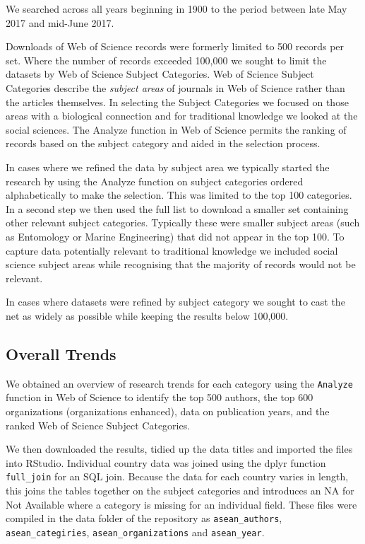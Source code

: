 \documentclass[]{book}
\theoremstyle{definition}
\theoremstyle{definition}
\theoremstyle{definition}
\theoremstyle{remark}
\begin{document}
We searched across all years beginning in 1900 to the period between
late May 2017 and mid-June 2017.

Downloads of Web of Science records were formerly limited to 500 records
per set. Where the number of records exceeded 100,000 we sought to limit
the datasets by Web of Science Subject Categories. Web of Science
Subject Categories describe the \emph{subject areas} of journals in Web
of Science rather than the articles themselves. In selecting the Subject
Categories we focused on those areas with a biological connection and
for traditional knowledge we looked at the social sciences. The Analyze
function in Web of Science permits the ranking of records based on the
subject category and aided in the selection process.

In cases where we refined the data by subject area we typically started
the research by using the Analyze function on subject categories ordered
alphabetically to make the selection. This was limited to the top 100
categories. In a second step we then used the full list to download a
smaller set containing other relevant subject categories. Typically
these were smaller subject areas (such as Entomology or Marine
Engineering) that did not appear in the top 100. To capture data
potentially relevant to traditional knowledge we included social science
subject areas while recognising that the majority of records would not
be relevant.

In cases where datasets were refined by subject category we sought to
cast the net as widely as possible while keeping the results below
100,000.

\hypertarget{overall-trends}{%
\subsection{Overall Trends}\label{overall-trends}}

We obtained an overview of research trends for each category using the
\texttt{Analyze} function in Web of Science to identify the top 500
authors, the top 600 organizations (organizations enhanced), data on
publication years, and the ranked Web of Science Subject Categories.

We then downloaded the results, tidied up the data titles and imported
the files into RStudio. Individual country data was joined using the
dplyr function \texttt{full\_join} for an SQL join. Because the data for
each country varies in length, this joins the tables together on the
subject categories and introduces an NA for Not Available where a
category is missing for an individual field. These files were compiled
in the data folder of the repository as \texttt{asean\_authors},
\texttt{asean\_categiries}, \texttt{asean\_organizations} and
\texttt{asean\_year}.
\end{document}
